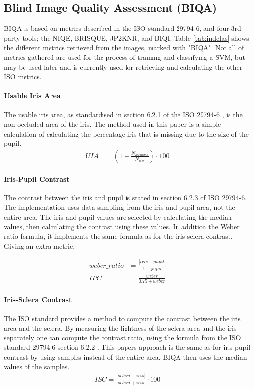 
\subsection{Blind Image Quality Assessment (BIQA)}\label{sec:biqa}
BIQA is based on metrics described in the ISO standard 29794-6\cite{iso},
and four 3rd party tools; the NIQE\cite{niqe}, BRISQUE\cite{brisque},
JP2KNR\cite{jp2knr}, and BIQI\cite{biqi}.
Table \ref{tab:indclas} shows the different metrics retrieved from
the images, marked with "BIQA". Not all of metrics gathered are used for the process of training and
classifying a SVM, but may be used later and is currently used for retrieving 
and calculating the other ISO metrics.



\paragraph{Usable Iris Area}
The usable iris area, as standardised in section 6.2.1 of the ISO 29794-6
\cite{iso}, is the non-occluded area of the iris.
The method used in this paper is a simple calculation of calculating the
percentage iris that is missing due to the size of the pupil.
\begin{align}
	UIA &= (1-\frac{N_{occluded}}{N_{iris}} ) \cdot 100
\end{align}



\paragraph{Iris-Pupil Contrast}
The contrast between the iris and pupil is stated in section 6.2.3 of ISO
29794-6\cite{iso}. 
The implementation uses data sampling from the iris and pupil 
area, not the entire area.  The iris and pupil values are selected by
calculating the median values, then calculating the contrast using these values.
In addition the Weber ratio formula, it implements the same formula as for the 
iris-sclera contrast. Giving an extra metric.

\begin{align}
	weber\_ratio &= \frac{|iris - pupil|}{1 + pupil}	\\
	IPC &= \frac{weber}{0.75 + weber}
\end{align}



\paragraph{Iris-Sclera Contrast}
The ISO standard provides a method to compute the contrast between the iris area
and the sclera. By measuring the lightness of the sclera area and the iris 
separately one can compute the contrast ratio, using the formula from the ISO
standard 29794-6 section 6.2.2 \cite{iso}.  This papers approach is the same as
for iris-pupil contrast by using samples instead of the entire area. BIQA then
uses the median values of the samples.
\begin{align}
	ISC = \frac{|sclera - iris|}{sclera + iris} \cdot 100
\end{align}




